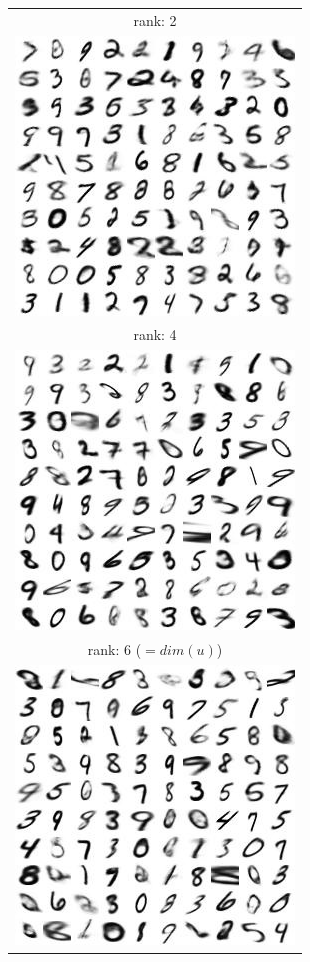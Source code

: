 \documentclass[letterpaper, twoside]{article}
\begin{document}
\begin{figure}[H]
\centering
\begin{minipage}{.5\textwidth}
\centering
\begin{tabular}{|@{}c@{}|}
\hline
rank: 2\\
\includegraphics[scale=1]{manifold_sig_47.jpg}\\ \hline
rank: 4\\
\includegraphics[scale=1]{manifold_sig_45.jpg}\\ \hline
rank: 6 ($=dim(u)$)\\
\includegraphics[scale=1]{manifold_sig_43.jpg}\\ \hline

\end{tabular}
\end{minipage}
\end{figure}
\end{document}
